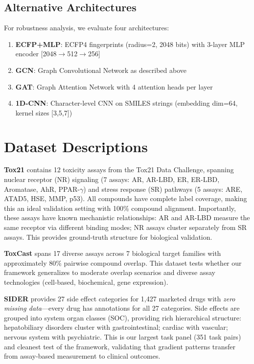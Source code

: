 \documentclass[sigconf,nonacm]{acmart}
\begin{document}
\subsection{Alternative Architectures}
For robustness analysis, we evaluate four architectures:
\begin{enumerate}[nosep,topsep=2pt]
    \item \textbf{ECFP+MLP}: ECFP4 fingerprints \cite{rogers2010ecfp} (radius=2, 2048 bits) with 3-layer MLP encoder [2048$\rightarrow$512$\rightarrow$256]
    \item \textbf{GCN}: Graph Convolutional Network \cite{kipf2017semi} as described above
    \item \textbf{GAT}: Graph Attention Network \cite{velickovic2018gat} with 4 attention heads per layer
    \item \textbf{1D-CNN}: Character-level CNN on SMILES strings \cite{weininger1988smiles} (embedding dim=64, kernel sizes [3,5,7])
\end{enumerate}

\section{Dataset Descriptions}
\label{app:datasets}

\textbf{Tox21} contains 12 toxicity assays from the Tox21 Data Challenge, spanning nuclear receptor (NR) signaling (7 assays: AR, AR-LBD, ER, ER-LBD, Aromatase, AhR, PPAR-$\gamma$) and stress response (SR) pathways (5 assays: ARE, ATAD5, HSE, MMP, p53). All compounds have complete label coverage, making this an ideal validation setting with 100\% compound alignment. Importantly, these assays have known mechanistic relationships: AR and AR-LBD measure the same receptor via different binding modes; NR assays cluster separately from SR assays. This provides ground-truth structure for biological validation.

\textbf{ToxCast} spans 17 diverse assays across 7 biological target families with approximately 80\% pairwise compound overlap. This dataset tests whether our framework generalizes to moderate overlap scenarios and diverse assay technologies (cell-based, biochemical, gene expression).

\textbf{SIDER} \cite{kuhn2016sider} provides 27 side effect categories for 1,427 marketed drugs with \textit{zero missing data}---every drug has annotations for all 27 categories. Side effects are grouped into system organ classes (SOC), providing rich hierarchical structure: hepatobiliary disorders cluster with gastrointestinal; cardiac with vascular; nervous system with psychiatric. This is our largest task panel (351 task pairs) and cleanest test of the framework, validating that gradient patterns transfer from assay-based measurement to clinical outcomes.
\end{document}

